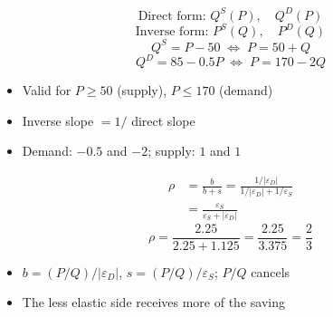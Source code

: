 \documentclass{beamer}
\begin{document}
\begin{frame}[plain,label=w2_appA_forms]
  \Large
  \[
    \tag{24}\;\text{Direct form: } Q^S(P), \quad Q^D(P)
  \]
  \[
    \tag{25}\;\text{Inverse form: } P^S(Q), \quad P^D(Q)
  \]
  \[
    \tag{26}\;Q^S = P - 50 \;\Leftrightarrow\; P = 50 + Q
  \]
  \[
    \tag{27}\;Q^D = 85 - 0.5P \;\Leftrightarrow\; P = 170 - 2Q
  \]

  \vspace{0.5em}
  \begin{itemize}\Large
    \item Valid for $P \ge 50$ (supply), $P \le 170$ (demand)
    \item Inverse slope $= 1 /$ direct slope
    \item Demand: $-0.5$ and $-2$; supply: $1$ and $1$
  \end{itemize}
\end{frame}

\begin{frame}[plain,label=w2_appC_passthrough]
  \Large
  \begin{align*}
    \tag{28}\;\rho &= \frac{b}{b + s}
      = \frac{1/|\varepsilon_D|}{1/|\varepsilon_D| + 1/\varepsilon_S}\\
    &= \frac{\varepsilon_S}{\varepsilon_S + |\varepsilon_D|}
  \end{align*}
  \[
    \tag{29}\;\rho = \frac{2.25}{2.25 + 1.125} = \frac{2.25}{3.375} = \frac{2}{3}
  \]

  \vspace{0.3em}
  \begin{itemize}\Large
    \item $b = (P/Q)/|\varepsilon_D|$, $s = (P/Q)/\varepsilon_S$; $P/Q$ cancels
    \item The less elastic side receives more of the saving
  \end{itemize}
\end{frame}
\end{document}
